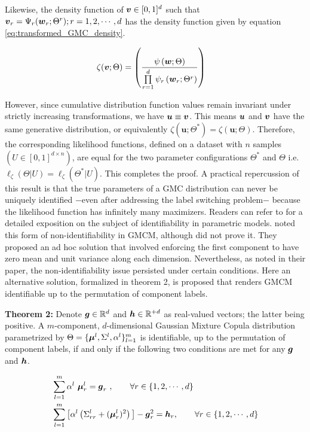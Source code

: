 \documentclass{article}
\begin{document}
Likewise, the density function of $\boldsymbol{v}\in [0,1]^d$ such that $\boldsymbol{v}_r = \Psi_r(\boldsymbol{w}_r;\Theta^r); r=1,2,\cdots, d $ has the density function given by equation \eqref{eq:transformed_GMC_density}.

\begin{align}\label{eq:transformed_GMC_density}
\zeta(\boldsymbol{v};\Theta) & = \left( \frac{\psi\left(\boldsymbol{w};\Theta\right)}{\prod\limits_{r=1}^{d}\psi_r\left(\boldsymbol{w}_r;\Theta^r \right)} \right)
\end{align}

However, since cumulative distribution function values remain invariant under strictly increasing transformations, we have $\boldsymbol{u} \equiv \boldsymbol{v}$. This means $\boldsymbol{u}$ and $\boldsymbol{v}$ have the same generative distribution, or equivalently $\zeta(\textbf{u};\Theta^*) = \zeta(\textbf{u};\Theta)$. Therefore, the corresponding likelihood functions, defined on a dataset with $n$ samples $(U \in [0 , 1]^{d\times n})$, are equal for the two parameter configurations $\Theta^*$ and $\Theta$ i.e. $\ell_\zeta(\Theta|U) = \ell_\zeta(\Theta^*|U)$. This completes the proof. A practical repercussion of this result is that the true parameters of a GMC distribution can never be uniquely identified $-$even after addressing the label switching problem$-$ because the likelihood function has infinitely many maximizers. Readers can refer to \citet{White1982} for a detailed exposition on the subject of identifiability in parametric models. \citet{Bilgrau2016} noted this form of non-identifiability in GMCM, although did not prove it. They proposed an ad hoc solution that involved enforcing the first component to have zero mean and unit variance along each dimension. Nevertheless, as noted in their paper, the non-identifiability issue persisted under certain conditions. Here an alternative solution, formalized in theorem 2, is proposed that renders GMCM identifiable up to the permutation of component labels.

 

\textbf{Theorem 2:} Denote $\boldsymbol{g}\in \mathbb{R}^d$ and $\boldsymbol{h}\in \mathbb{R}^{+d}$ as real-valued vectors; the latter being positive. A $m$-component, $d$-dimensional Gaussian Mixture Copula distribution parametrized by $\Theta = \{\boldsymbol{\mu}^l, \Sigma^l, \alpha^l\}_{l=1}^m$ is identifiable, up to the permutation of component labels, if and only if the following two conditions are met for any $\boldsymbol{g}$ and $\boldsymbol{h}$.

\begin{align}
&\sum_{l=1}^m \alpha^l \ \boldsymbol{\mu}_r^l=\boldsymbol{g}_r \ ,\qquad \forall r \in \{1,2,\cdots,d\} \nonumber \\
&\sum_{l=1}^m \big[ \alpha^l \left(\Sigma_{rr}^l+(\boldsymbol{\mu}_r^l)^2\right)\big] -\boldsymbol{g}_r^2 =\boldsymbol{h}_r ,\qquad \forall r \in \{1,2,\cdots,d\}\nonumber
\end{align}
\end{document}
